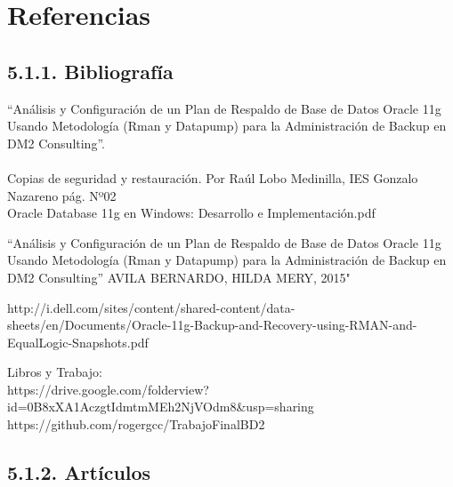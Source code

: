 \documentclass[12pt,letterpaper]{article}
\begin{document}
{\newpage
\section{Referencias}
\subsection{5.1.1. Bibliografía}
\begin{enumerate}
\bf{}
\end{enumerate}
\begin{enumerate}
``Análisis y Configuración de un Plan de Respaldo de Base de Datos Oracle 11g Usando Metodología (Rman y Datapump) para la Administración de Backup en DM2 Consulting”. \\
\\
Copias de seguridad y restauración. Por Raúl Lobo Medinilla, IES Gonzalo Nazareno
pág. Nº02 \\
Oracle Database 11g en Windows: Desarrollo e Implementación.pdf
\\

\end{enumerate}
\begin{enumerate}
\bf{}
\end{enumerate}
\begin{enumerate}
``Análisis y Configuración de un Plan de Respaldo de Base de Datos Oracle 11g Usando Metodología (Rman y Datapump) para la Administración de Backup en DM2 Consulting” AVILA BERNARDO, HILDA MERY, 2015" \\
\end{enumerate}

\begin{enumerate}
http://i.dell.com/sites/content/shared-content/data-sheets/en/Documents/Oracle-11g-Backup-and-Recovery-using-RMAN-and-EqualLogic-Snapshots.pdf
\end{enumerate}
\begin{enumerate}
Libros y Trabajo: \\
https://drive.google.com/folderview?id=0B8xXA1AczgtIdmtmMEh2NjVOdm8&usp=sharing \\
https://github.com/rogergcc/TrabajoFinalBD2
\end{enumerate}

\subsection{5.1.2. Artículos}

}
\end{document}
